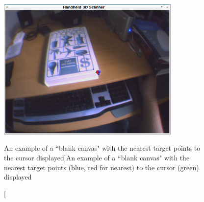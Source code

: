 \documentclass[a4paper,10pt]{article}
\begin{document}
\begin{figure}
  \begin{center}
    \includegraphics[width=340px]{TargetPoints}
  \end{center}
  \caption[An example of a ``blank canvas" with the nearest target points to the cursor displayed]{An example of a ``blank canvas" with the nearest target points (blue, red for nearest) to the cursor (green) displayed}
  \label{targets}
\end{figure}
\end{document}
